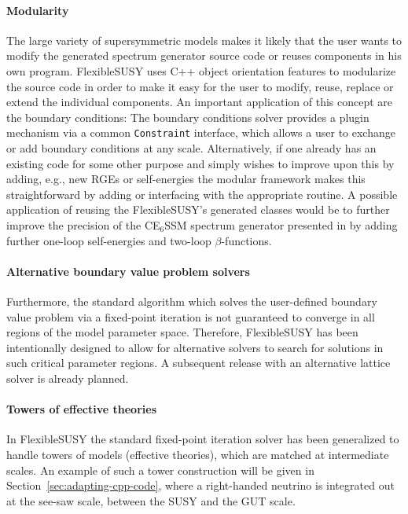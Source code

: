\documentclass[final,3p,11pt,pdflatex]{elsarticle}
\makeatletter
\newcommand{\fs}{FlexibleSUSY\@\xspace}
\newcommand{\code}[1]{\lstinline|#1|}  %
\newcommand{\secref}[1]{Section~\ref{#1}}
\makeatother
\begin{document}
\paragraph{Modularity}

The large variety of supersymmetric models makes it likely that the
user wants to modify the generated spectrum generator source code or
reuses components in his own program. \fs uses C++ object orientation
features to modularize the source code in order to make it easy for
the user to modify, reuse, replace or extend the individual
components.  An important application of this concept are the boundary
conditions: The boundary conditions solver provides a plugin mechanism
via a common \code{Constraint} interface, which allows a user to
exchange or add boundary conditions at any scale.  Alternatively, if
one already has an existing code for some other purpose and simply
wishes to improve upon this by adding, e.g., new RGEs or self-energies
the modular framework makes this straightforward by adding or
interfacing with the appropriate routine.  A possible application of
reusing the \fs's generated classes would be to further improve the
precision of the CE$_6$SSM spectrum generator presented in
\cite{Athron:2009bs,Athron:2012pw} by adding further one-loop
self-energies and two-loop $\beta$-functions.

\paragraph{Alternative boundary value problem solvers}

Furthermore, the standard algorithm which solves the user-defined
boundary value problem via a fixed-point iteration is not guaranteed
to converge in all regions of the model parameter space.  Therefore,
\fs has been intentionally designed to allow for alternative solvers
to search for solutions in such critical parameter regions.  A
subsequent release with an alternative lattice solver is already
planned.

\paragraph{Towers of effective theories}

In \fs the standard fixed-point iteration solver has been generalized
to handle towers of models (effective theories), which are matched at
intermediate scales.  An example of such a tower construction will be
given in \secref{sec:adapting-cpp-code}, where a right-handed neutrino
is integrated out at the see-saw scale, between the SUSY and the GUT
scale.
\end{document}
